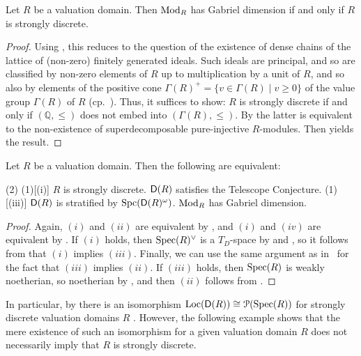 \documentclass[reqno,a4paper]{amsart}
\begin{document}
\begin{corollary}\label{cor:kgforvd}
    Let $R$ be a valuation domain. Then $\operatorname{Mod}_R$ has Gabriel dimension if and only if $R$ is strongly discrete.
\end{corollary}
\begin{proof}
    Using , this reduces to the question of the existence of dense chains of the lattice of (non-zero) finitely generated ideals. Such ideals are principal, and so are classified by non-zero elements of $R$ up to multiplication by a unit of $R$, and so also by elements of the positive cone $\Gamma(R)^+=\{v\in\Gamma(R)\mid v\ge 0\}$ of the value group $\Gamma(R)$ of $R$ (cp.~\cite[Proposition 2.8]{bt25}). Thus, it suffices to show: $R$ is strongly discrete if and only if $(\mathbb{Q},\leq)$ does not embed into $(\Gamma(R),\leq)$. By  \cite[Corollary~4.2]{puninskii_superdecomposable} the latter is equivalent to the non-existence of superdecomposable pure-injective $R$-modules. Then \cite[Theorem XIII.5.11]{fs01} yields the result.
\end{proof}
\begin{theorem}\label{thm:kg=stratforvd}
    Let $R$ be a valuation domain. Then the following are equivalent:
\begin{tasks}[style=enumerate, label-align=right ,column-sep = {-7mm},item-indent = {7mm},label-offset = {0.8em} ](2)
        \task*(1)[(i)] $R$ is strongly discrete.
        \task*[(ii)] $\mathsf{D}(R)$ satisfies the Telescope Conjecture.
        \task*(1)[(iii)] $\mathsf{D}(R)$ is stratified by $\operatorname{Spc}(\mathsf{D}(R)^\omega)$.
        \task*[(iv)] $\operatorname{Mod}_R$ has Gabriel dimension.
    \end{tasks}
\end{theorem}
\begin{proof}
   Again, $(i)$ and $(ii)$ are equivalent by \cite[\S7]{gldm1}, and $(i)$ and $(iv)$ are equivalent by .
   If $(i)$ holds, then $\operatorname{Spec}(R)^\vee$ is a $T_D$-space by  and , so it follows from  that $(i)$ implies $(iii)$.
   Finally, we can use the same argument as in~ for the fact that $(iii)$ implies $(ii)$. If $(iii)$ holds, then $\operatorname{Spec}(R)$ is weakly noetherian, so noetherian by , and then $(ii)$ follows from \cite[Theorem~9.11]{bhs23}.
\end{proof}
In particular, by  there is an isomorphism $\operatorname{Loc}(\mathsf{D}(R))\cong \mathcal{P}(\operatorname{Spec}(R))$ for strongly discrete valuation domains $R$ . However, the following example shows that the mere existence of such an isomorphism for a given valuation domain $R$ does not necessarily imply that $R$ is strongly discrete.
\end{document}
